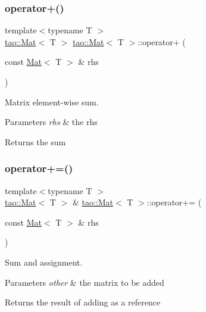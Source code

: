 \subsubsection{\texorpdfstring{operator+()}{operator+()}}
{\footnotesize\ttfamily template$<$typename T $>$ \\
\mbox{\hyperlink{classtao_1_1_mat}{tao\+::\+Mat}}$<$ T $>$ \mbox{\hyperlink{classtao_1_1_mat}{tao\+::\+Mat}}$<$ T $>$\+::operator+ (\begin{DoxyParamCaption}\item[{const \mbox{\hyperlink{classtao_1_1_mat}{Mat}}$<$ T $>$ \&}]{rhs }\end{DoxyParamCaption})}



Matrix element-\/wise sum. 


\begin{DoxyParams}{Parameters}
{\em rhs} & the rhs \\
\hline
\end{DoxyParams}
\begin{DoxyReturn}{Returns}
the sum 
\end{DoxyReturn}
\mbox{\label{classtao_1_1_mat_a8033892f80dec7742fbae2d4142718c9}} 
\subsubsection{\texorpdfstring{operator+=()}{operator+=()}}
{\footnotesize\ttfamily template$<$typename T $>$ \\
\mbox{\hyperlink{classtao_1_1_mat}{tao\+::\+Mat}}$<$ T $>$ \& \mbox{\hyperlink{classtao_1_1_mat}{tao\+::\+Mat}}$<$ T $>$\+::operator+= (\begin{DoxyParamCaption}\item[{const \mbox{\hyperlink{classtao_1_1_mat}{Mat}}$<$ T $>$ \&}]{rhs }\end{DoxyParamCaption})}



Sum and assignment. 


\begin{DoxyParams}{Parameters}
{\em other} & the matrix to be added \\
\hline
\end{DoxyParams}
\begin{DoxyReturn}{Returns}
the result of adding as a reference 
\end{DoxyReturn}
\mbox{\label{classtao_1_1_mat_a05438bfc32bbf1cb404baea6d596d92b}} 

